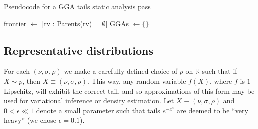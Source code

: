 
\begin{algorithm}
	\caption{Pseudocode for a GGA tails static analysis pass}\label{alg:bfs_typecheck}
	frontier $\gets$ [rv : Parents(rv) = $\emptyset$]\;
	GGAs $\gets \{\}$\;
\end{algorithm}


\subsection{Representative distributions}\label{ssec:repr_dist}

For each $(\nu,\sigma,\rho)$ we make a carefully defined choice of $p$ on $\mathbb{R}$ such that if $X \sim p$, then $X \equiv (\nu,\sigma,\rho)$. This way, any random variable $f(X)$, where $f$ is $1$-Lipschitz, will exhibit the correct tail, and so approximations of this form may be used for variational inference or density estimation. Let $X \equiv (\nu,\sigma,\rho)$ and $0 < \epsilon \ll 1$ denote a small parameter such that tails $e^{-x^\epsilon}$ are deemed to be ``very heavy'' (we chose $\epsilon = 0.1$). %

